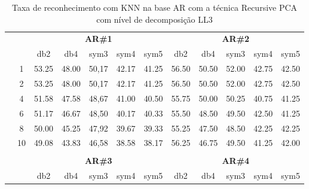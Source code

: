 \begin{table}[H]
	\centering
    \normalsize
	\caption{Taxa de reconhecimento com KNN na base AR com a técnica Recursive PCA com nível de decomposição LL3}
	\begin{tabular}{|c|c|c c c c c|c c c c c|}
\cline{3-12}
\multicolumn{2}{c|}{\multirow{2}{*}{}} & \multicolumn{5}{c|}{\textbf{AR\#1}}  & \multicolumn{5}{c|}{\textbf{AR\#2}} \\\cline{3-12}

\multicolumn{2}{c|}{}  & db2 & db4 & sym3 & sym4 & sym5 & db2 & db4& sym3 & sym4 & sym5 \\\hline

\multicolumn{1}{|c|}{ \multirow{5}{*}{\rotatebox[origin=c]{90}{\textbf{K-vizinhos}}} }
&1	&53.25	&48.00	&50,17	&42.17	&41.25	&56.50	&50.50	&52.00	&42.75	&42.50\\\cline{2-12}
&2	&53.25	&48.00	&50,17	&42.17	&41.25	&56.50	&50.50	&52.00	&42.75	&42.50\\\cline{2-12}
&4	&51.58	&47.58	&48,67	&41.00	&40.50	&55.75	&50.00	&50.25	&40.75	&41.25\\\cline{2-12}
&6	&51.17	&46.67	&48,50	&40.17	&40.33	&55.50	&48.50	&49.50	&42.50	&41.25\\\cline{2-12}
&8	&50.00	&45.25	&47,92	&39.67	&39.33	&55.25	&47.50	&48.50	&42.25	&42.25\\\cline{2-12}
&10	&49.08	&43.83	&46,58	&38.58	&38.17	&56.25	&46.75	&49.50	&41.25	&42.00 \\ \midrule
\multicolumn{12}{c}{}\\ 




\cline{3-12}
\multicolumn{2}{c}{} & \multicolumn{5}{|c|}{\textbf{AR\#3}}  & \multicolumn{5}{c|}{\textbf{AR\#4}} \\\cline{3-12}
\multicolumn{2}{c}{}  & \multicolumn{1}{|c}{db2} & db4 & sym3 & sym4 & sym5 & db2 & db4& sym3 & sym4 & sym5 \\\hline


\end{tabular}
\end{table}
